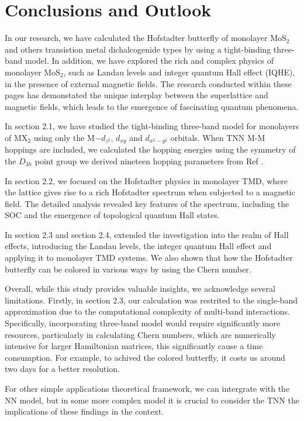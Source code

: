 
\section{Conclusions and Outlook}
In our research, we have calculated the Hofstadter butterfly of monolayer MoS$_{2}$ and others transistion metal dichalcogenide types by using a tight-binding three-band model. In addition, we have explored the rich and complex physics of monolayer MoS$_2$, such as Landau levels and integer quantum Hall effect (IQHE), in the presence of external magnetic fields. The research conducted within these pages has demonstated the unique interplay between the superlattice and magnetic fields, which leads to the emergence of fascinating quantum phenomena.

In section 2.1, we have studied the tight-binding three-band model for monolayers of MX$_{2}$ using only the M$-d_{z^{2}}$, $d_{xy}$ and $d_{x^{2} - y{^2}}$ orbitals. When TNN M-M hoppings are included, we calculated the hopping energies using the symmetry of the $D_{3h}$ point group we derived nineteen hopping parameters from Ref \cite{PhysRevB.88.085433}.

In section 2.2, we focused on the Hofstadter physics in monolayer TMD, where the lattice gives rise to a rich Hofstadter spectrum when subjected to a magnetic field. The detailed analysis revealed key features of the spectrum, including the SOC and the emergence of topological quantum Hall states. 

In section 2.3 and section 2.4, extended the investigation into the realm of Hall effects, introducing the Landau levels, the integer quantum Hall effect and applying it to monolayer TMD systems. We also shown that how the Hofstadter butterfly can be colored in various ways by using the Chern number.

Overall, while this study provides valuable insights, we acknowledge several limitations. Firstly, in section 2.3, our calculation was restrited to the single-band approximation due to the computational complexity of multi-band interactions. Specifically, incorporating three-band model would require significantly more resources, particularly in calculating Chern numbers, which are numerically intensive for larger Hamiltonian matrices, this significantly cause a time consumption. For example, to achived the colored butterfly, it costs us around two days for a better resolution.

For other simple applications theoretical framework, we can intergrate with the \ac{NN} model, but in some more complex model it is crucial to consider the \ac{TNN} the implications of these findings in the context.
